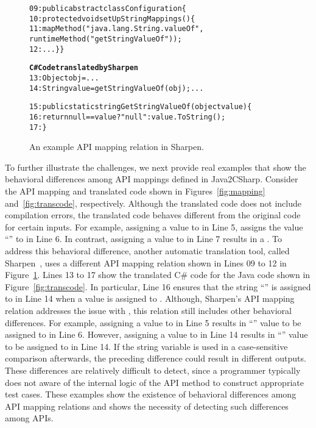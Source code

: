 \begin{figure}
\begin{CodeOut}
\begin{alltt}
09: public abstract class Configuration \{
10: protected void setUpStringMappings() \{
11:   mapMethod("java.lang.String.valueOf",
              runtimeMethod("getStringValueOf"));
12: ...\} \}

\textbf{C# Code translated by Sharpen}
13: Object obj = ...
14: String value = getStringValueOf(obj); ...

15: public static string GetStringValueOf(object value)\{
16:   return null == value? "null": value.ToString();
17: \}
\end{alltt}
\end{CodeOut}\vspace*{-4ex}
\caption{\label{fig:sharpen} An example API mapping relation in Sharpen.}\vspace*{-4ex}
\end{figure}

To further illustrate the challenges, we next provide real examples that show the behavioral differences among API mappings defined in Java2CSharp. Consider the API mapping and translated code shown in Figures~\ref{fig:mapping} and~\ref{fig:transcode}, respectively. Although the translated code does not include compilation errors, the translated code behaves different from the original code for certain inputs. For example, assigning a  value to  in Line 5, assigns the value ``'' to   in Line 6. In contrast, assigning a  value to  in Line 7 results in a . To address this behavioral difference, another automatic translation tool, called Sharpen~\cite{Sharpen}, uses a different API mapping relation shown in Lines 09 to 12 in Figure~\ref{fig:sharpen}. Lines 13 to 17 show the translated C\# code for the Java code shown in Figure~\ref{fig:transcode}. In particular, Line 16 ensures that the string ``'' is assigned to  in Line 14 when a  value is assigned to . Although, Sharpen's API mapping relation addresses the issue with , this relation still includes other behavioral differences. For example, assigning a  value to  in Line 5 results in ``'' value to be assigned to  in Line 6. However, assigning a  value to  in Line 14 results in ``'' value to be assigned to  in Line 14. If the string variable  is used in a case-sensitive comparison afterwards, the preceding difference could result in different outputs. These differences are relatively difficult to detect, since a programmer typically does not aware of the internal logic of the API method to construct appropriate test cases. These examples show the existence of behavioral differences among API mapping relations and shows the necessity of detecting such differences among APIs.

